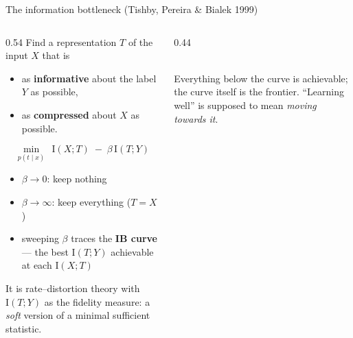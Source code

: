 \documentclass[aspectratio=169,11pt]{beamer}
\newcommand{\I}{\mathrm{I}}
\newcommand{\HH}{\mathrm{H}}
\begin{document}
\begin{frame}{The information bottleneck (Tishby, Pereira \& Bialek 1999)}
\begin{columns}[T]
\begin{column}{0.54\textwidth}
Find a representation $T$ of the input $X$ that is
\begin{itemize}
  \item as \textbf{informative} about the label $Y$ as possible,
  \item as \textbf{compressed} about $X$ as possible.
\end{itemize}
\[ \min_{p(t\mid x)}\ \ \I(X;T) \;-\; \beta\,\I(T;Y) \]
\begin{itemize}\small
  \item $\beta \to 0$: keep nothing
  \item $\beta \to \infty$: keep everything ($T = X$)
  \item sweeping $\beta$ traces the \textbf{IB curve} --- the best $\I(T;Y)$
        achievable at each $\I(X;T)$
\end{itemize}
\medskip
\footnotesize
It is rate--distortion theory with $\I(T;Y)$ as the fidelity measure: a
\emph{soft} version of a minimal sufficient statistic.
\end{column}
\begin{column}{0.44\textwidth}
\centering
{}\\[4pt]
\footnotesize Everything below the curve is achievable; the curve itself is the
frontier. ``Learning well'' is supposed to mean \emph{moving towards it}.
\end{column}
\end{columns}
\end{frame}
\end{document}
